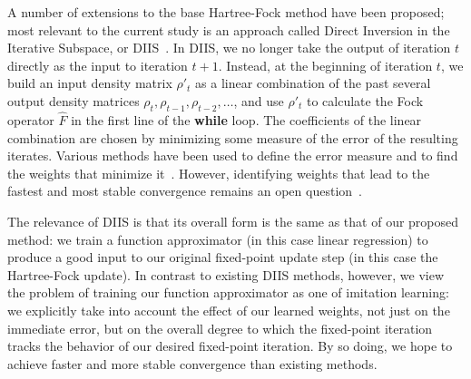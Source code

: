 \documentclass[twoside,11pt]{article}
\begin{document}
A number of extensions to the base Hartree-Fock method have been proposed; most relevant to the current study is an approach called Direct Inversion in the Iterative Subspace, or DIIS~\citep{Pulay1980}. In DIIS, we no longer take the output of iteration $t$ directly as the input to iteration $t+1$.  Instead, at the beginning of iteration $t$, we build an input density matrix $\rho'_{t}$ as a linear combination of the past several output density matrices $\rho_t, \rho_{t-1}, \rho_{t-2}, \ldots$, and use $\rho'_{t}$ to calculate the Fock operator $\hat F$ in the first line of the \textbf{while} loop.  The coefficients of the linear combination are chosen by minimizing some measure of the error of the resulting iterates.  Various methods have been used to define the error measure and to find the weights that minimize it~\citep{ADIIS,compScuseria,Alejandro2012}. However, identifying weights that lead to the fastest and most stable convergence remains an open question~\citep{Konstantin2002, Thorsten2011}.

The relevance of DIIS is that its overall form is the same as that of our proposed method: we train a function approximator (in this case linear regression) to produce a good input to our original fixed-point update step (in this case the Hartree-Fock update).  In contrast to existing DIIS methods, however, we view the problem of training our function approximator as one of imitation learning: we explicitly take into account the effect of our learned weights, not just on the immediate error, but on the overall degree to which the fixed-point iteration tracks the behavior of our desired fixed-point iteration.  By so doing, we hope to achieve faster and more stable convergence than existing methods.


\end{document}
